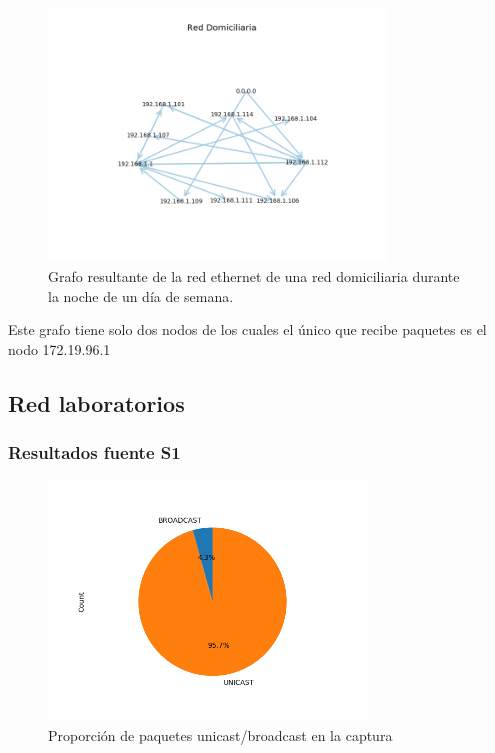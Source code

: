 \begin{figure}[H]
 \centering
	\includegraphics[width=0.8\textwidth]{figs/red_domiciliaria.png}
	\caption{Grafo resultante de la red ethernet de una red domiciliaria durante la noche de un día de semana.}
	\label{fig:starbucks-grafo}
\end{figure}

Este grafo tiene solo dos nodos de los cuales el único que recibe paquetes es el nodo 172.19.96.1

\subsection*{Red laboratorios}

\subsubsection*{Resultados fuente S1}
\begin{figure}[H]
  \centering
  \includegraphics[width=8.5cm]{figs/broadcast_proportion_labo6_2018_04_18_S1_output.png}
  \caption{\normalfont Proporción de paquetes unicast/broadcast en la captura}
\end{figure}

